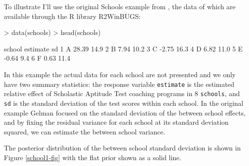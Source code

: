 \documentclass{article}
\let\proglang=\textsf
\newcommand{\pkg}[1]{{\fontseries{b}\selectfont #1}}
\begin{document}
To illustrate I'll use the original Schools example from \citet{Gelman.2006}, the data of which are available through the \proglang{R} library \pkg{R2WinBUGS}:

\begin{Schunk}
\begin{Sinput}
> data(schools)
> head(schools)
\end{Sinput}
\begin{Soutput}
  school estimate   sd
1      A    28.39 14.9
2      B     7.94 10.2
3      C    -2.75 16.3
4      D     6.82 11.0
5      E    -0.64  9.4
6      F     0.63 11.4
\end{Soutput}
\end{Schunk}

In this example the actual data for each school are not presented and we only have two summary statistics: the response variable \texttt{estimate} is the estimated relative effect of Scholastic Aptitude Test coaching programs in 8 \texttt{schools}, and \texttt{sd} is the standard deviation of the test scores within each school. In the original example Gelman focused on the standard deviation of the between school effects, and by fixing the residual variance for each school at its standard deviation squared, we can estimate the between school variance.  

\begin{Schunk}
\end{Schunk}

The posterior distribution of the between school standard deviation is shown in Figure \ref{school1-fig} with the flat prior shown as a solid line.\\ 
\end{document}
